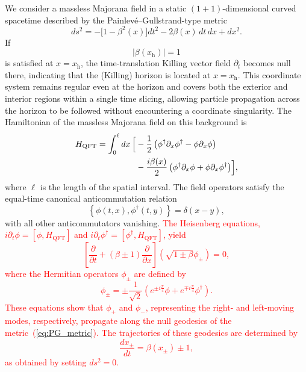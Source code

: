 \documentclass[reprint,amsmath,amssymb,aps,showkeys,superscriptaddress]{revtex4-2}
\newcommand{\red}{\textcolor{red}}
\begin{document}
We consider a massless Majorana field in a static
$(1+1)$-dimensional curved spacetime described by the
Painlev\'e--Gullstrand-type metric
\begin{equation}
  ds^2
  =
  -\bigl[1-\beta^2(x)\bigr]dt^2
  -2\beta(x)\,dt\,dx
  +dx^2.
  \label{eq:PG_metric}
\end{equation}
If 
\begin{equation}
  \bigl|\beta(x_{\mathrm h})\bigr|=1 
  \label{eq:horizon_condition}
\end{equation}
is satisfied at $x=x_{\mathrm h}$, the time-translation Killing vector field $\partial_t$ becomes null there, 
indicating that the (Killing) horizon is located at $x=x_{\mathrm h}$.
This coordinate system remains regular even at the horizon and covers both the
exterior and interior regions within a single time slicing, allowing
particle propagation across the horizon to be followed without
encountering a coordinate singularity. 
The Hamiltonian of the massless Majorana field on this background is
\begin{equation}
\begin{aligned}
  H_{\mathrm{QFT}}
  =
  \int_0^\ell dx\,
  \Bigl[
  &-\frac{1}{2}
  \left(
    \phi^\dagger\partial_x\phi^\dagger
    -
    \phi\partial_x\phi
  \right)
  \\
  &-\frac{i\beta(x)}{2}
  \left(
    \phi^\dagger\partial_x\phi
    +
    \phi\partial_x\phi^\dagger
  \right)
  \Bigr],
\end{aligned}
  \label{eq:continuum_Hamiltonian}
\end{equation}
where $\ell$ is the length of the spatial interval. The field
operators satisfy the equal-time canonical anticommutation relation
\begin{equation}
  \left\{
    \phi(t,x),\phi^{\dagger}(t,y)
  \right\}
  =
  \delta(x-y),
\label{eq:continuum_anticommutation}
\end{equation}
with all other anticommutators vanishing.
\red{
The Heisenberg equations,
$i\partial_t \phi = [\phi, H_{\mathrm{QFT}}]$ and $i\partial_t \phi^{\dagger} = [\phi^{\dagger}, H_{\mathrm{QFT}}]$,  
yield  
\begin{equation}
    \left[\frac{\partial}{\partial t} + (\beta \pm 1) \frac{\partial}{\partial x}\right] (\sqrt{1\pm \beta} \phi_\pm) = 0 ,
\end{equation}
where the Hermitian operators $\phi_\pm$ are defined by 
\begin{equation}
    \phi_\pm = \pm \frac{1}{\sqrt{2}} \left(e^{\pm i \frac{\pi}{4}} \phi + e^{\mp i \frac{\pi}{4}} \phi^\dagger \right) .
\end{equation}
These equations show that $\phi_+$ and $\phi_-$, representing the right- and left-moving modes, respectively, propagate along the null geodesics of the metric~(\ref{eq:PG_metric}). 
The trajectories of these geodesics are determined by 
\begin{equation}
    \frac{dx_\pm}{dt}=\beta(x_\pm) \pm 1,
\end{equation}
as obtained by setting $ds^2 = 0$.
}
\end{document}
